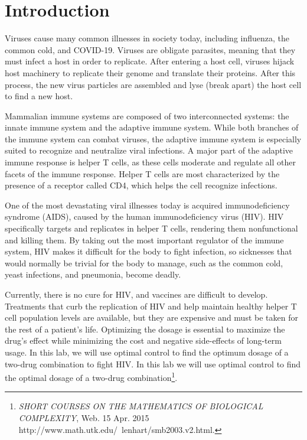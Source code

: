 \label{lab:hiv}

\section*{Introduction}
Viruses cause many common illnesses in society today, including influenza, the common cold, and COVID-19. Viruses are obligate parasites, meaning that they must infect a host in order to replicate. After entering a host cell, viruses hijack host machinery to replicate their genome and translate their proteins. After this process, the new virus particles are assembled and lyse (break apart) the host cell to find a new host.

Mammalian immune systems are composed of two interconnected systems: the innate immune system and the adaptive immune system. While both branches of the immune system can combat viruses, the adaptive immune system is especially suited to recognize and neutralize viral infections. A major part of the adaptive immune response is helper T cells, as these cells moderate and regulate all other facets of the immune response. Helper T cells are most characterized by the presence of a receptor called CD4, which helps the cell recognize infections.  

One of the most devastating viral illnesses today is acquired immunodeficiency syndrome (AIDS), caused by the human immunodeficiency virus (HIV). HIV specifically targets and replicates in helper T cells, rendering them nonfunctional and killing them. By taking out the most important regulator of the immune system, HIV makes it difficult for the body to fight infection, so sicknesses that would normally be trivial for the body to manage, such as the common cold, yeast infections, and pneumonia, become deadly.

Currently, there is no cure for HIV, and vaccines are difficult to develop. Treatments that curb the replication of HIV and help maintain healthy helper T cell population levels are available, but they are expensive and must be taken for the rest of a patient’s life. Optimizing the dosage is essential to maximize the drug’s effect while minimizing the cost and negative side-effects of long-term usage. In this lab, we will use optimal control to find the optimum dosage of a two-drug combination to fight HIV.
In this lab we will use optimal control to find the optimal dosage of a two-drug combination\footnote{\textit{SHORT COURSES ON THE MATHEMATICS OF BIOLOGICAL COMPLEXITY}, Web. 15 Apr. 2015 http://www.math.utk.edu/~lenhart/smb2003.v2.html.}.
   
